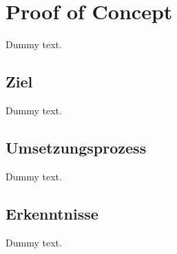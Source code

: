 \chapter{Proof of Concept}

Dummy text.

\section{Ziel}

Dummy text.

\section{Umsetzungsprozess}

Dummy text.

\section{Erkenntnisse}

Dummy text.